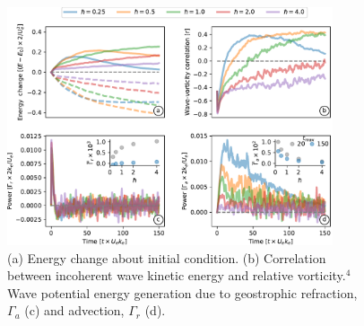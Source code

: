 \documentclass[final]{beamer}
\begin{document}
\begin{frame}[t]
\begin{columns}[t]
\begin{column}{0.55\textwidth}
\begin{columns}
\begin{column}{.475\textwidth}
                        \begin{figure}
                          \includegraphics[width=0.9\textwidth]{figs/hslash_dependence_turbulence.pdf}
                          \caption{(a) Energy change about initial condition.
                                  (b)  Correlation between
                                  incoherent wave
                                  kinetic energy and relative vorticity.$^4$ Wave potential
                                  energy generation
                                  due to geostrophic refraction, $\Gamma_a$ (c) and advection, $\Gamma_r$ (d).}
                        \end{figure}

                      \end{column}

                      \hspace{0.cm}

                      \begin{column}{0.475\textwidth}


\end{column}
\end{columns}
\end{column}
\end{columns}
\end{frame}
\end{document}
